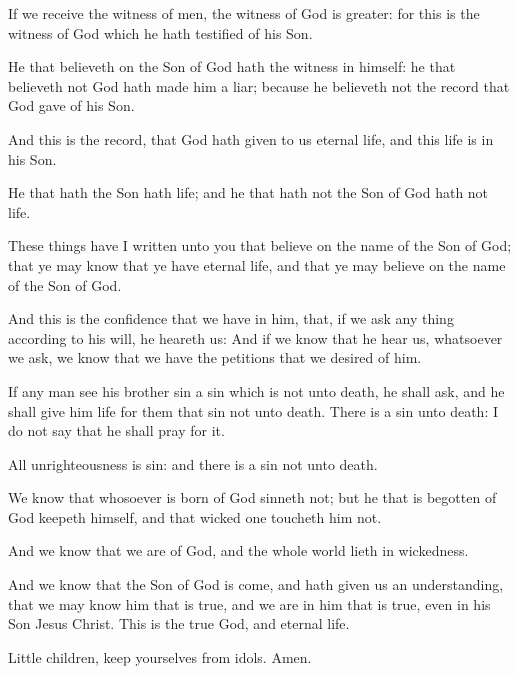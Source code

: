 \verse If we receive the witness of men, the witness of God is greater: for this is the witness of God which he hath testified of his Son.

\verse He that believeth on the Son of God hath the witness in himself: he that believeth not God hath made him a liar; because he believeth not the record that God gave of his Son.

\verse And this is the record, that God hath given to us eternal life, and this life is in his Son.

\verse He that hath the Son hath life; and he that hath not the Son of God hath not life.

\verse These things have I written unto you that believe on the name of the Son of God; that ye may know that ye have eternal life, and that ye may believe on the name of the Son of God.

\verse And this is the confidence that we have in him, that, if we ask any thing according to his will, he heareth us: \verse And if we know that he hear us, whatsoever we ask, we know that we have the petitions that we desired of him.

\verse If any man see his brother sin a sin which is not unto death, he shall ask, and he shall give him life for them that sin not unto death. There is a sin unto death: I do not say that he shall pray for it.

\verse All unrighteousness is sin: and there is a sin not unto death.

\verse We know that whosoever is born of God sinneth not; but he that is begotten of God keepeth himself, and that wicked one toucheth him not.

\verse And we know that we are of God, and the whole world lieth in wickedness.

\verse And we know that the Son of God is come, and hath given us an understanding, that we may know him that is true, and we are in him that is true, even in his Son Jesus Christ. This is the true God, and eternal life.

\verse Little children, keep yourselves from idols. Amen.

